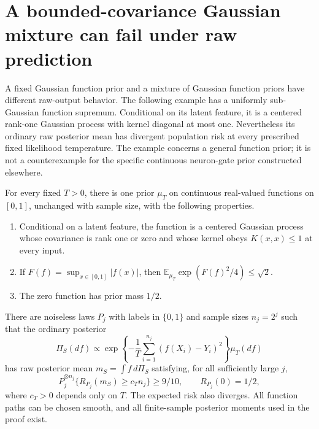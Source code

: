 \section{A bounded-covariance Gaussian mixture can fail under raw prediction}
\label{sec:gaussian-mixture-obstruction}
A fixed Gaussian function prior and a mixture of Gaussian function priors have different raw-output behavior. The following example has a uniformly sub-Gaussian function supremum. Conditional on its latent feature, it is a centered rank-one Gaussian process with kernel diagonal at most one. Nevertheless its ordinary raw posterior mean has divergent population risk at every prescribed fixed likelihood temperature. The example concerns a general function prior; it is not a counterexample for the specific continuous neuron-gate prior constructed elsewhere.

\begin{theorem}
\label{thm:gaussian-mixture-obstruction}
For every fixed $T>0$, there is one prior $\mu_T$ on continuous real-valued functions on $[0,1]$, unchanged with sample size, with the following properties.
\begin{enumerate}
 \item Conditional on a latent feature, the function is a centered Gaussian process whose covariance is rank one or zero and whose kernel obeys $K(x,x)\le1$ at every input.
 \item If $F(f)=\sup_{x\in[0,1]}|f(x)|$, then
 $\mathbb E_{\mu_T}\exp(F(f)^2/4)\le\sqrt2$.
 \item The zero function has prior mass $1/2$.
\end{enumerate}
There are noiseless laws $P_j$ with labels in $\{0,1\}$ and sample sizes $n_j=2^j$ such that the ordinary posterior
\[
 \Pi_S(df)\propto
       \exp\left\{-\frac1T\sum_{i=1}^{n_j}(f(X_i)-Y_i)^2\right\}\mu_T(df)
\]
has raw posterior mean $m_S=\int f\,d\Pi_S$ satisfying, for all sufficiently large $j$,
\[
 P_j^{\otimes n_j}\{R_{P_j}(m_S)\ge c_T n_j\}\ge9/10,
 \qquad R_{P_j}(0)=1/2,
\]
where $c_T>0$ depends only on $T$. The expected risk also diverges. All function paths can be chosen smooth, and all finite-sample posterior moments used in the proof exist.
\end{theorem}

